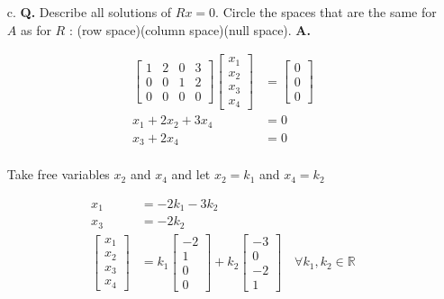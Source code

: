\documentclass[main.tex]{subfiles}
\begin{document}
\begin{enumerate}
\begin{enumerate}
    \item [c.] \textbf{Q.} Describe all solutions of $R x=0$. Circle the spaces that are the same for $A$ as for $R$ : (row space)(column space)(null space). 
    \textbf{A.}
    
    $$
    \begin{aligned}
    \left[\begin{array}{llll}
    1 & 2 & 0 & 3 \\
    0 & 0 & 1 & 2 \\
    0 & 0 & 0 & 0
    \end{array}\right] \left[\begin{array}{l}
    x_1 \\
    x_2 \\
    x_3 \\
    x_4
    \end{array}\right] & = \left[\begin{array}{l}
    0 \\
    0 \\
    0
    \end{array}\right]\\
    x_1 + 2x_2 + 3x_4 &= 0\\
    x_3 + 2x_4 & = 0\\
    \end{aligned}
    $$
    
    Take free variables $x_2$ and $x_4$ and let $x_2=k_1$ and $x_4 = k_2$
    
    $$
    \begin{aligned}
    x_1 &= -2k_1 - 3k_2\\
    x_3 &= -2k_2\\
    \left[\begin{array}{c}
    x_{1} \\
    x_{2} \\
    x_{3} \\
    x_{4}
    \end{array}\right]&=k_{1}\left[\begin{array}{c}
    -2 \\
    1 \\
    0 \\
    0
    \end{array}\right]+k_{2}\left[\begin{array}{c}
    -3 \\
    0 \\
    -2 \\
    1
    \end{array}\right] \quad \forall k_1,k_2 \in \mathbb{R}
    \end{aligned}
    $$


\end{enumerate}
\end{enumerate}
\end{document}
